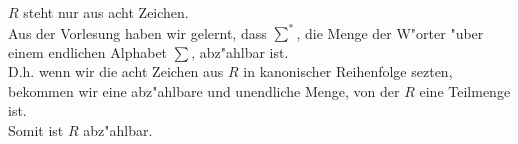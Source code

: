 \documentclass[a4paper,11pt]{scrartcl}
\begin{document}
%
%	
%	
%	
%	
%	
%	
%	
%	
%	
%	
%	
%	
%	
%	
%		
%	
	$R$ steht nur aus acht Zeichen. \\
	Aus der Vorlesung haben wir gelernt, dass $\sum ^{*}$, die Menge der W"orter "uber einem endlichen Alphabet $\sum$, abz"ahlbar ist.\\
	D.h. wenn wir die acht Zeichen aus $R$ in kanonischer Reihenfolge sezten, bekommen wir eine abz"ahlbare und unendliche Menge, von der $R$ eine Teilmenge ist.\\
	Somit ist $R$ abz"ahlbar.
	
\end{document}
